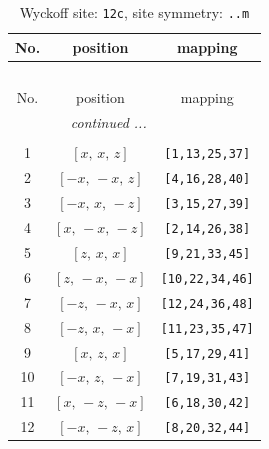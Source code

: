 \documentclass[fleqn,8pt]{jsarticle}
\begin{document}
\begin{longtable}{ccc}
\caption{Wyckoff site: {\tt 12c}, site symmetry: {\tt ..m}}
 \\
 \hline \hline
No. & position & mapping \\ \hline \endfirsthead

\multicolumn{2}{l}{\tablename\ \thetable{}} \\
 \hline \hline
No. & position & mapping \\ \hline \endhead

 \hline \hline
\multicolumn{2}{r}{\footnotesize\it continued ...} \\ \endfoot

 \hline \hline
\multicolumn{2}{r}{} \\ \endlastfoot

1 & $\left[ x,\, x,\, z \right]$ & {\tt [1,13,25,37]} \\ \hline
2 & $\left[ - x,\, - x,\, z \right]$ & {\tt [4,16,28,40]} \\ \hline
3 & $\left[ - x,\, x,\, - z \right]$ & {\tt [3,15,27,39]} \\ \hline
4 & $\left[ x,\, - x,\, - z \right]$ & {\tt [2,14,26,38]} \\ \hline
5 & $\left[ z,\, x,\, x \right]$ & {\tt [9,21,33,45]} \\ \hline
6 & $\left[ z,\, - x,\, - x \right]$ & {\tt [10,22,34,46]} \\ \hline
7 & $\left[ - z,\, - x,\, x \right]$ & {\tt [12,24,36,48]} \\ \hline
8 & $\left[ - z,\, x,\, - x \right]$ & {\tt [11,23,35,47]} \\ \hline
9 & $\left[ x,\, z,\, x \right]$ & {\tt [5,17,29,41]} \\ \hline
10 & $\left[ - x,\, z,\, - x \right]$ & {\tt [7,19,31,43]} \\ \hline
11 & $\left[ x,\, - z,\, - x \right]$ & {\tt [6,18,30,42]} \\ \hline
12 & $\left[ - x,\, - z,\, x \right]$ & {\tt [8,20,32,44]} \\
\end{longtable}
\renewcommand{\arraystretch}{1.2}
\end{document}
